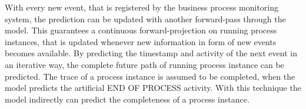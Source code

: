With every new event, that is registered by the business process monitoring system, the prediction can be updated with another forward-pass through the model.
This guarantees a continuous forward-projection on running process instances, that is updated whenever new information in form of new events becomes available.
By predicting the timestamp and activity of the next event in an iterative way, the complete future path of running process instance can be predicted.
The trace of a process instance is assumed to be completed, when the model predicts the artificial END OF PROCESS activity.
With this technique the model indirectly can predict the completeness of a process instance.